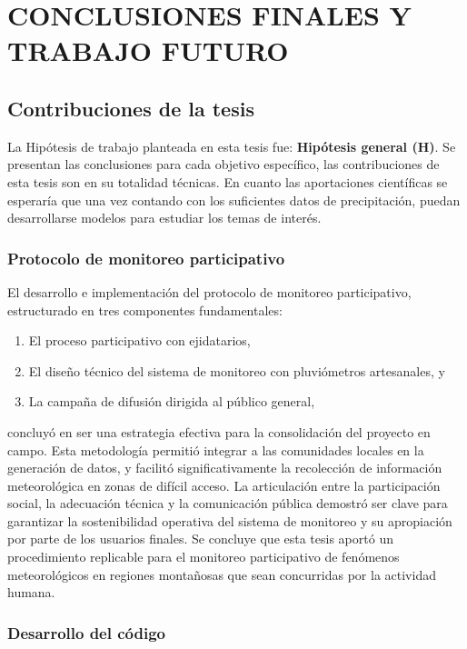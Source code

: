 \chapter{CONCLUSIONES FINALES Y TRABAJO FUTURO}
\section{Contribuciones de la tesis}
La Hipótesis de trabajo planteada en esta tesis fue: \textbf{Hipótesis general (H)}. Se presentan las conclusiones para cada objetivo específico, las contribuciones de esta tesis son en su totalidad técnicas. En cuanto las aportaciones científicas se esperaría que una vez contando con los suficientes datos de precipitación, puedan desarrollarse modelos para estudiar los temas de interés. 
\subsection{Protocolo de monitoreo participativo}
El desarrollo e implementación del protocolo de monitoreo participativo, estructurado en tres componentes fundamentales:

\begin{enumerate}
  \item El proceso participativo con ejidatarios,
  \item El diseño técnico del sistema de monitoreo con pluviómetros artesanales, y
  \item La campaña de difusión dirigida al público general,
\end{enumerate}

concluyó en ser una estrategia efectiva para la consolidación del proyecto en campo. Esta metodología permitió integrar a las comunidades locales en la generación de datos, y facilitó significativamente la recolección de información meteorológica en zonas de difícil acceso. La articulación entre la participación social, la adecuación técnica y la comunicación pública demostró ser clave para garantizar la sostenibilidad operativa del sistema de monitoreo y su apropiación por parte de los usuarios finales. Se concluye que esta tesis aportó un procedimiento replicable para el monitoreo participativo de fenómenos meteorológicos en regiones montañosas que sean concurridas por la actividad humana.


\subsection{Desarrollo del código}

